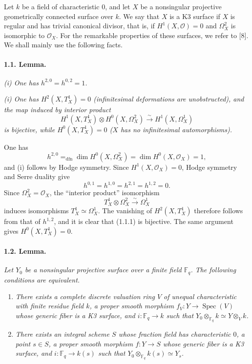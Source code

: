 \documentclass[10pt,leqno]{article}
\newcommand{\Fp}{\mathbb{F}_q}
\newcommand{\Spec}{\operatorname{Spec}}
\newcommand{\dfn}{\mathrm{dfn}}
\newcommand{\iso}{\xrightarrow{\sim}}
\begin{document}
\clearpage

Let $k$ be a field of characteristic $0$, and let $X$ be a nonsingular projective geometrically connected surface over $k$. We say that $X$ is a K3 surface if $X$ is regular and has trivial canonical divisor, that is, if $H^1(X,\mathcal O)=0$ and $\Omega_X^2$ is isomorphic to $\mathcal O_X$. For the remarkable properties of these surfaces, we refer to [8]. We shall mainly use the following facts.

\paragraph{1.1. Lemma.} \emph{(i) One has $h^{2,0}=h^{0,2}=1$.}

\emph{(i) One has $H^2(X,T_X^1)=0$ (infinitesimal deformations are unobstructed), and the map induced by interior product
\[
\tag{1.1.1}
H^1(X,T_X^1)\otimes H^0(X,\Omega_X^2)\iso H^1(X,\Omega_X^1)
\]
is bijective, while $H^0(X,T_X^1)=0$ ($X$ has no infinitesimal automorphisms).}

One has
\[
h^{2,0}=_{\dfn}\dim H^0(X,\Omega_X^2)=\dim H^0(X,\mathcal O_X)=1,
\]
and (i) follows by Hodge symmetry. Since $H^1(X,\mathcal O_X)=0$, Hodge symmetry and Serre duality give
\[
h^{0,1}=h^{1,0}=h^{2,1}=h^{1,2}=0.
\]
Since $\Omega_X^2=\mathcal O_X$, the ``interior product'' isomorphism
\[
T_X^1\otimes\Omega_X^2\iso\Omega_X^1
\]
induces isomorphisms $T_X^1\simeq\Omega_X^1$. The vanishing of $H^2(X,T_X^1)$ therefore follows from that of $h^{1,2}$, and it is clear that (1.1.1) is bijective. The same argument gives $H^0(X,T_X^1)=0$.

\paragraph{1.2. Lemma.} \emph{Let $Y_0$ be a nonsingular projective surface over a finite field $\Fp$. The following conditions are equivalent.}
\begin{enumerate}[label=(\roman*)]
\item \emph{There exists a complete discrete valuation ring $V$ of unequal characteristic with finite residue field $k$, a proper smooth morphism $f_V:Y\to\Spec(V)$ whose generic fiber is a K3 surface, and $i:\Fp\to k$ such that $Y_0\otimes_{\Fp}k\simeq Y\otimes_V k$.}
\item \emph{There exists an integral scheme $S$ whose fraction field has characteristic $0$, a point $s\in S$, a proper smooth morphism $f:Y\to S$ whose generic fiber is a K3 surface, and $i:\Fp\to k(s)$ such that $Y_0\otimes_{\Fp}k(s)\simeq Y_s$.}
\end{enumerate}
\end{document}
